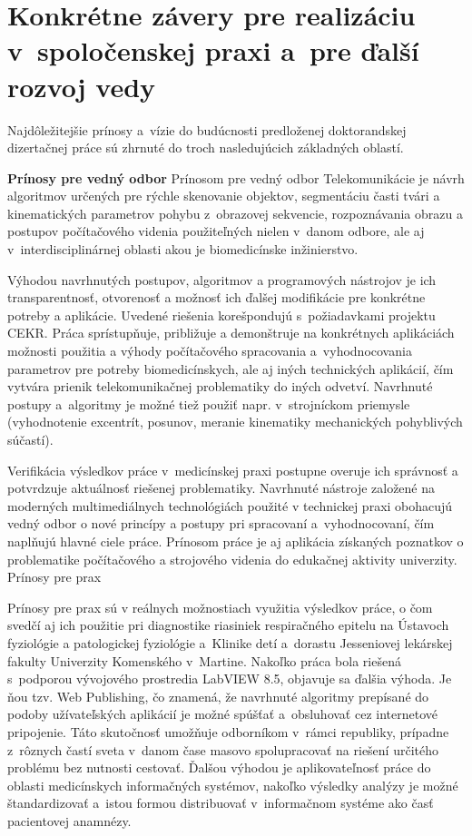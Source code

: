 \chapter{Konkrétne závery pre realizáciu v spoločenskej praxi a pre ďalší rozvoj vedy}

\pagestyle{fancy}
\fancyhf{}
\fancyfoot[CE,CO]{\thepage}



Najdôležitejšie prínosy a vízie do budúcnosti predloženej doktorandskej dizertačnej práce sú zhrnuté do troch nasledujúcich základných oblastí.

\textbf{Prínosy pre vedný odbor}
Prínosom pre vedný odbor Telekomunikácie je návrh algoritmov určených pre rýchle skenovanie objektov, segmentáciu časti tvári a   kinematických parametrov pohybu z obrazovej sekvencie, rozpoznávania obrazu a postupov počítačového videnia použiteľných nielen v danom odbore, ale aj v interdisciplinárnej oblasti akou je biomedicínske inžinierstvo. 

Výhodou navrhnutých postupov, algoritmov a programových nástrojov je ich transparentnosť, otvorenosť a možnosť ich ďalšej modifikácie pre konkrétne potreby a aplikácie. Uvedené riešenia korešpondujú s požiadavkami projektu CEKR. Práca sprístupňuje, približuje a demonštruje na konkrétnych aplikáciách možnosti použitia a výhody počítačového spracovania a vyhodnocovania parametrov pre potreby biomedicínskych, ale aj iných technických aplikácií, čím vytvára prienik telekomunikačnej problematiky do iných odvetví.  Navrhnuté postupy a algoritmy je možné tiež použiť napr. v strojníckom priemysle (vyhodnotenie excentrít, posunov, meranie kinematiky mechanických pohyblivých súčastí). 

Verifikácia výsledkov práce v medicínskej praxi postupne overuje ich správnosť a potvrdzuje aktuálnosť riešenej problematiky. Navrhnuté nástroje založené na moderných multimediálnych technológiách použité v technickej praxi obohacujú vedný odbor o nové princípy a postupy pri spracovaní a vyhodnocovaní, čím naplňujú hlavné ciele práce. Prínosom práce je aj aplikácia získaných poznatkov o problematike počítačového a strojového videnia do edukačnej aktivity univerzity. 
Prínosy pre prax

Prínosy pre prax sú v reálnych možnostiach využitia výsledkov práce, o čom svedčí aj ich použitie pri diagnostike riasiniek respiračného epitelu na Ústavoch fyziológie  a patologickej fyziológie a Klinike detí a dorastu Jesseniovej lekárskej fakulty Univerzity Komenského v Martine. Nakoľko práca bola riešená s podporou vývojového prostredia LabVIEW 8.5, objavuje sa ďalšia výhoda. Je ňou tzv. Web Publishing, čo znamená, že navrhnuté algoritmy prepísané do podoby užívateľských aplikácií je možné spúšťať a obsluhovať cez internetové pripojenie. Táto skutočnosť umožňuje odborníkom v rámci republiky, prípadne z rôznych častí sveta v danom čase masovo spolupracovať na riešení určitého problému bez nutnosti cestovať.
Ďalšou výhodou je aplikovateľnosť práce do oblasti medicínskych informačných systémov, nakoľko výsledky analýzy je možné štandardizovať a istou formou distribuovať v informačnom systéme ako časť pacientovej anamnézy.

